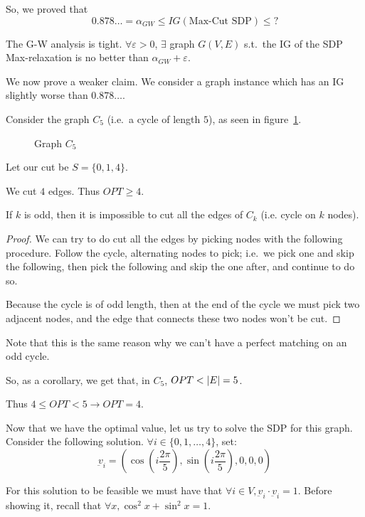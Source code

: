     So, we proved that
    \[ 0.878\dots = \alpha_{GW} \leq IG (\text{Max-Cut SDP}) \leq ? \]

    The G-W analysis is tight.
    $\forall \varepsilon > 0$, $\exists$ graph $G(V,E)$ s.t.~the IG of the SDP Max-relaxation is no better than $\alpha_{GW} + \varepsilon$.

    We now prove a weaker claim.
    We consider a graph instance which has an IG slightly worse than $0.878\dots$.

    Consider the graph $C_5$ (i.e.~a cycle of length $5$), as seen in figure~\ref{fig:c5}.

    \begin{figure}[h]
        \centering
        
        \caption{Graph $C_5$}
        \label{fig:c5}
    \end{figure}

    Let our cut be $S = \{ 0,1,4 \}$.

    We cut $4$ edges. Thus $OPT \geq 4$.

    \begin{lemma}
        If $k$ is odd, then it is impossible to cut all the edges of $C_k$ (i.e. cycle on $k$ nodes).
    \end{lemma}

    \begin{proof}
        We can try to do cut all the edges by picking nodes with the following procedure.
        Follow the cycle, alternating nodes to pick; i.e.~we pick one and skip the following, then pick the following and skip the one after, and continue to do so.

        Because the cycle is of odd length, then at the end of the cycle we must pick two adjacent nodes, and the edge that connects these two nodes won't be cut.
    \end{proof}

    Note that this is the same reason why we can't have a perfect matching on an odd cycle.

    So, as a corollary, we get that, in $C_5$, $OPT < \vert E \vert = 5$.

    Thus $4 \leq OPT < 5 \rightarrow OPT=4$.

    Now that we have the optimal value, let us try to solve the SDP for this graph.
    Consider the following solution. $\forall i \in \{ 0,1, \dots, 4 \}$, set:
    \[ \underbar{v}_i = (\cos (i \frac{2\pi}{5}), \sin (i \frac{2\pi}{5}), 0,0,0) \]

    For this solution to be feasible we must have that $\forall i \in V, \underbar{v}_i \cdot \underbar{v}_i = 1$.
    Before showing it, recall that $\forall x, \cos^2 x + \sin^2 x = 1$.

